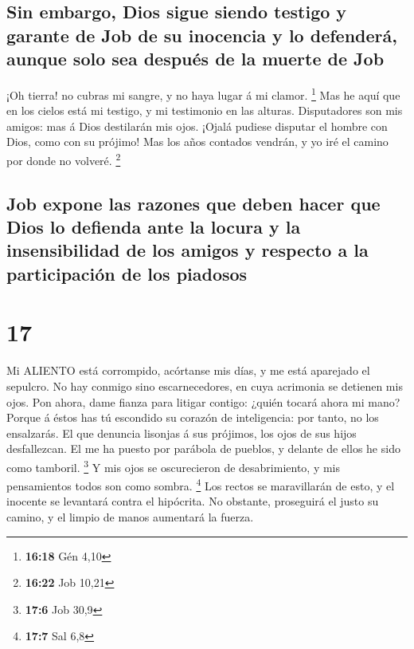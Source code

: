 \hypertarget{sin-embargo-dios-sigue-siendo-testigo-y-garante-de-job-de-su-inocencia-y-lo-defenderuxe1-aunque-solo-sea-despuuxe9s-de-la-muerte-de-job}{%
\subsection{Sin embargo, Dios sigue siendo testigo y garante de Job de
su inocencia y lo defenderá, aunque solo sea después de la muerte de
Job}\label{sin-embargo-dios-sigue-siendo-testigo-y-garante-de-job-de-su-inocencia-y-lo-defenderuxe1-aunque-solo-sea-despuuxe9s-de-la-muerte-de-job}}

 ¡Oh tierra! no cubras mi sangre, y no haya lugar á mi
clamor. \footnote{\textbf{16:18} Gén 4,10}  Mas he aquí que
en los cielos está mi testigo, y mi testimonio en las alturas.
 Disputadores son mis amigos: mas á Dios destilarán mis
ojos.  ¡Ojalá pudiese disputar el hombre con Dios, como con
su prójimo!  Mas los años contados vendrán, y yo iré el
camino por donde no volveré. \footnote{\textbf{16:22} Job 10,21}

\hypertarget{job-expone-las-razones-que-deben-hacer-que-dios-lo-defienda-ante-la-locura-y-la-insensibilidad-de-los-amigos-y-respecto-a-la-participaciuxf3n-de-los-piadosos}{%
\subsection{Job expone las razones que deben hacer que Dios lo defienda
ante la locura y la insensibilidad de los amigos y respecto a la
participación de los
piadosos}\label{job-expone-las-razones-que-deben-hacer-que-dios-lo-defienda-ante-la-locura-y-la-insensibilidad-de-los-amigos-y-respecto-a-la-participaciuxf3n-de-los-piadosos}}

\hypertarget{section-16}{%
\section{17}\label{section-16}}

 Mi ALIENTO está corrompido, acórtanse mis días, y me está
aparejado el sepulcro.  No hay conmigo sino escarnecedores,
en cuya acrimonia se detienen mis ojos.  Pon ahora, dame
fianza para litigar contigo: ¿quién tocará ahora mi mano? 
Porque á éstos has tú escondido su corazón de inteligencia: por tanto,
no los ensalzarás.  El que denuncia lisonjas á sus prójimos,
los ojos de sus hijos desfallezcan.  El me ha puesto por
parábola de pueblos, y delante de ellos he sido como tamboril.
\footnote{\textbf{17:6} Job 30,9}  Y mis ojos se
oscurecieron de desabrimiento, y mis pensamientos todos son como sombra.
\footnote{\textbf{17:7} Sal 6,8}  Los rectos se maravillarán
de esto, y el inocente se levantará contra el hipócrita.  No
obstante, proseguirá el justo su camino, y el limpio de manos aumentará
la fuerza.

